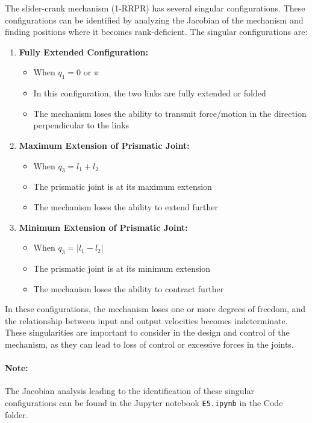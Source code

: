 \begin{solution}
    The slider-crank mechanism (1-RRPR) has several singular configurations. These configurations can be identified by analyzing the Jacobian of the mechanism and finding positions where it becomes rank-deficient. The singular configurations are:

    \begin{enumerate}
        \item \textbf{Fully Extended Configuration:}
        \begin{itemize}
            \item When $q_1 = 0$ or $\pi$
            \item In this configuration, the two links are fully extended or folded
            \item The mechanism loses the ability to transmit force/motion in the direction perpendicular to the links
        \end{itemize}

        \item \textbf{Maximum Extension of Prismatic Joint:}
        \begin{itemize}
            \item When $q_3 = l_1 + l_2$
            \item The prismatic joint is at its maximum extension
            \item The mechanism loses the ability to extend further
        \end{itemize}

        \item \textbf{Minimum Extension of Prismatic Joint:}
        \begin{itemize}
            \item When $q_3 = |l_1 - l_2|$
            \item The prismatic joint is at its minimum extension
            \item The mechanism loses the ability to contract further
        \end{itemize}
    \end{enumerate}

    In these configurations, the mechanism loses one or more degrees of freedom, and the relationship between input and output velocities becomes indeterminate. These singularities are important to consider in the design and control of the mechanism, as they can lead to loss of control or excessive forces in the joints.

    \paragraph{Note:} The Jacobian analysis leading to the identification of these singular configurations can be found in the Jupyter notebook \texttt{E5.ipynb} in the Code folder.
\end{solution}


